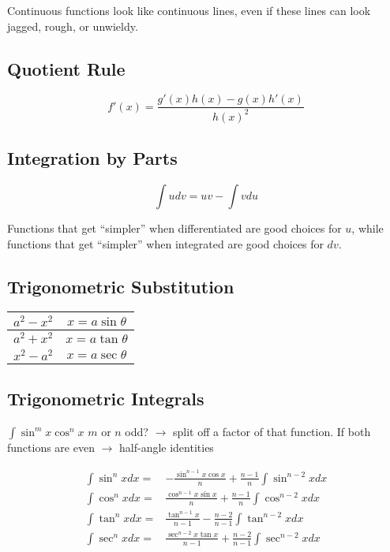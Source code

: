 Continuous functions look like continuous lines, even if these lines can look jagged, rough, or unwieldy.

\begin{multicols}{2}

\subsection{Quotient Rule}

$$f'(x) = \displaystyle{\frac{g'(x)h(x) - g(x)h'(x)}{h(x)^{2}}}$$

\subsection{Integration by Parts}

$$ \int udv = uv - \int vdu $$

Functions that get ``simpler'' when differentiated are good choices for $u$, while functions that get ``simpler'' when integrated are good choices for $dv$.

\subsection{Trigonometric Substitution}

\begin{center}

\begin{tabular}{c|c}

$a^{2} - x^{2}$ & $x=a\sin{\theta}$\\ \hline

$a^{2} + x^{2}$ & $x=a\tan{\theta}$\\ \hline

$x^{2} - a^{2}$ & $x=a\sec{\theta}$

\end{tabular}

\end{center}

\end{multicols}

\subsection{Trigonometric Integrals}

$\displaystyle{\int \sin^{m}{x}\cos^{n}{x}}$ $m$ or $n$ odd? $\rightarrow$ split off a factor of that function. If both functions are even $\rightarrow$ half-angle identities

\begin{align*}
\displaystyle{\int \sin^{n}{x}dx} =& \displaystyle{-\frac{\sin^{n-1}{x}\cos{x}}{n} + \frac{n-1}{n}\int \sin^{n-2}{x}dx}\\
\displaystyle{\int \cos^{n}{x}dx} =& \displaystyle{\frac{\cos^{n-1}{x}\sin{x}}{n} + \frac{n-1}{n}\int \cos^{n-2}{x}dx}\\
\displaystyle{\int \tan^{n}{x}dx} =& \displaystyle{\frac{\tan^{n-1}{x}}{n-1} - \frac{n-2}{n-1}\int \tan^{n-2}{x}dx}\\
\displaystyle{\int \sec^{n}{x}dx} =& \displaystyle{\frac{\sec^{n-2}{x}\tan{x}}{n-1} + \frac{n-2}{n-1}\int \sec^{n-2}{x}dx}
\end{align*}


